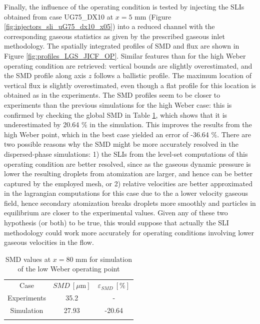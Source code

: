 Finally, the influence of the operating condition is tested by injecting the SLIs obtained from case UG75\_DX10 at $x = 5$ mm (Figure \ref{fig:injectors_sli_uG75_dx10_x05}) into a reduced channel with the corresponding gaseous statistics as given by the prescribed gaseous inlet methodology. The spatially integrated profiles of SMD and flux are shown in Figure \ref{fig:profiles_LGS_JICF_OP}. Similar features than for the high Weber operating condition are retrieved: vertical bounds are slightly overestimated, and the SMD profile along axis $z$ follows a ballistic profile. The maximum location of vertical flux is slightly overestimated, even though a flat profile for this location is obtained as in the experiments. The SMD profiles seem to be closer to experiments than the previous simulations for the high Weber case: this is confirmed by checking the global SMD in Table \ref{tab:SMD_deviations_OP}, which shows that it is underestimated by 20.64 $\%$ in the simulation. This improves the results from the high Weber point, which in the best case yielded an error of -36.64 $\%$. There are two possible reasons why the SMD might be more accurately resolved in the dispersed-phase simulations: 1) the SLIs from the level-set computations of this operating condition are better resolved, since as the gaseous dynamic pressure is lower the resulting droplets from atomization are larger, and hence can be better captured by the employed mesh, or 2) relative velocities are better approximated in the lagrangian computations for this case due to the a lower velocity gaseous field, hence secondary atomization breaks droplets more smoothly and particles in equilibrium are closer to the experimental values. Given any of these two hypothesis (or both) to be true, this would suppose that actually the SLI methodology could work more accurately for operating conditions involving lower gaseous velocities in the flow. 


\begin{table}[!h]
\centering
\caption{SMD values at $x = 80$ mm for simulation of the low Weber operating point}
\begin{tabular}{ccc}
\thickhline
Case & $SMD~\left[\mu \mathrm{m} \right]$ & $\varepsilon_{SMD}~\left[\% \right]$ \\
\thickhline
Experiments & 35.2 & - \\
Simulation & 27.93 & -20.64 \\
\thickhline
\end{tabular}
\label{tab:SMD_deviations_OP}
\end{table}


